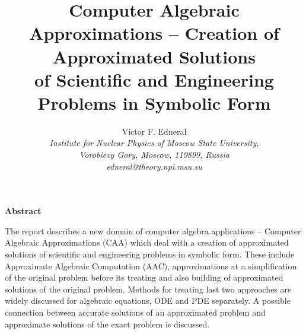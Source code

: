 \setlength{\textwidth}{14.0cm}
\setlength{\topmargin}{-1.0cm}
\setlength{\textheight}{21.0cm}

\title{Computer Algebraic Approximations -- Creation of Approximated Solutions\\
         of Scientific and Engineering Problems in Symbolic Form
       }

\author{Victor F. Edneral\\ 
\em Institute for Nuclear Physics of Moscow State University,\\ 
\em Vorobievy Gory, Moscow, 119899, Russia\\
edneral@theory.npi.msu.su
           }

\date{}


\maketitle 
\thispagestyle{empty}

\centerline{\bf Abstract}
\vspace{1cm}

   The report describes a new domain of computer algebra applications -- Computer Algebraic 
Approximations (CAA) which deal with a creation of approximated solutions of scientific and 
engineering problems in symbolic form. These include Approximate Algebraic Computation (AAC), 
approximations at a simplification of the original problem before its treating and also building of 
approximated solutions of the original problem. Methods for treating last two approaches are widely 
discussed for algebraic equations, ODE and PDE separately. A possible connection between accurate 
solutions of an approximated problem and approximate solutions of the exact problem is discussed.



